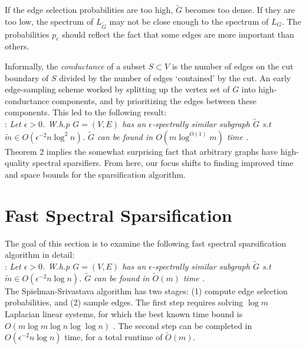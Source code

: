 \documentclass{article}
\begin{document}
If the edge selection probabilities are too high, $\tilde{G}$ becomes too
dense. If they are too low, the spectrum of $L_{\tilde{G}}$ may not be close
enough to the spectrum of $L_G$. The probabilities $p_e$ should reflect the
fact that some edges are more important than others.

Informally, the \textit{conductance} of a subset $S \subset V$ is the number
of edges on the cut boundary of $S$ divided by the number of edges
`contained' by the cut.  An early edge-sampling scheme worked by splitting
up the vertex set of $G$ into high-conductance components, and by
prioritizing the edges between these components. This led to the following
result: \\

\noindent
{}: \textit{Let $\epsilon > 0$. W.h.p $G =
(V, E)$ has an $\epsilon$-spectrally similar subgraph $\tilde{G}$ s.t
$\tilde{m} \in O(\epsilon^{-2}n\log^2 n)$. $\tilde{G}$ can be found in
$O(m\log^{O(1)}m)$ time \cite{SpielmanTeng} \cite{TheSurvey}.} \\

Theorem 2 implies the somewhat surprising fact that arbitrary graphs have
high-quality spectral sparsifiers. From here, our focus shifts to finding
improved time and space bounds for the sparsification algorithm.

\section{Fast Spectral Sparsification}

The goal of this section is to examine the following fast spectral
sparsification algorithm in detail: \\

\noindent
{}: \textit{Let $\epsilon > 0$.
W.h.p $G = (V, E)$ has an $\epsilon$-spectrally similar subgraph $\tilde{G}$
s.t $\tilde{m} \in O(\epsilon^{-2}n\log n)$. $\tilde{G}$ can be found in
$\tilde{O}(m)$ time \cite{SpielmanSrivastava} \cite{TheSurvey}.} \\

The Spielman-Srivastava algorithm has two stages: (1) compute edge selection
probabilities, and (2) sample edges. The first step requires solving $\log
m$ Laplacian linear systems, for which the best known time bound is $O(m
\log m \log n \log\log n)$ \cite{FastLaplacianSolver} \cite{TheSurvey}. The
second step can be completed in $O(\epsilon^{-2}n\log n)$ time, for a total
runtime of $\tilde{O}(m)$.
\end{document}
